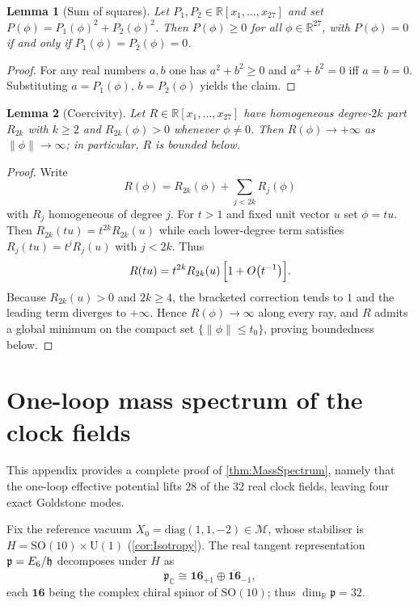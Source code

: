 \documentclass[pdflatex,sn-mathphys-num]{sn-jnl}
\theoremstyle{thmstyleone}
\newtheorem{lemma}[lemma]{Lemma}
\theoremstyle{thmstyletwo}%
\theoremstyle{thmstylethree}%
\newcommand{\SO}[1]{\mathrm{SO(#1)}}
\newcommand{\U}[1]{\mathrm{U(#1)}}
\newcommand{\E}[1]{\mathrm{E_{#1}}}
\newcommand{\SOTen}{\SO{10}}
\newcommand{\UOne}{\U{1}}
\newcommand{\ESix}{\E{6}}
\begin{document}
\begin{appendices}
\begin{lemma}[Sum of squares]\label{lem:A-sumsq}
Let $P_{1},P_{2}\in\mathbb R[x_{1},\dots,x_{27}]$ and set
\(P(\phi)=P_{1}(\phi)^{2}+P_{2}(\phi)^{2}\).
Then \(P(\phi)\ge 0\) for all \(\phi\in\mathbb R^{27}\), with
\(P(\phi)=0\) if and only if \(P_{1}(\phi)=P_{2}(\phi)=0\).
\end{lemma}

\begin{proof}
For any real numbers $a,b$ one has $a^{2}+b^{2}\ge 0$ and
$a^{2}+b^{2}=0$ iff $a=b=0$.  Substituting
\(a=P_{1}(\phi),\,b=P_{2}(\phi)\) yields the claim.
\end{proof}

\begin{lemma}[Coercivity]\label{lem:A-coercive}
Let \(R\in\mathbb R[x_{1},\dots,x_{27}]\) have homogeneous degree-$2k$
part \(R_{2k}\) with $k\ge2$ and \(R_{2k}(\phi)>0\) whenever
\(\phi\neq 0\).  Then \(R(\phi)\to +\infty\) as
\(\|\phi\|\to\infty\); in particular, \(R\) is bounded below.
\end{lemma}

\begin{proof}
Write
\[R(\phi)=R_{2k}(\phi)+\sum_{j<2k}R_{j}(\phi)\]
with $R_{j}$ homogeneous of degree $j$.  For
\(t>1\) and fixed unit vector \(u\) set $\phi=tu$.  Then
\(R_{2k}(tu)=t^{2k}R_{2k}(u)\) while each lower-degree term satisfies
\(R_{j}(tu)=t^{j}R_{j}(u)\) with $j<2k$.  Thus
\[
  R(tu)=t^{2k}R_{2k}(u)\,\Bigl[1+O\bigl(t^{-1}\bigr)\Bigr].
\]
Because \(R_{2k}(u)>0\) and \(2k\ge4\), the bracketed correction tends to
$1$ and the leading term diverges to \(+\infty\).  Hence
\(R(\phi)\to\infty\) along every ray, and $R$ admits a global minimum on
the compact set $\{\|\phi\|\le t_{0}\}$, proving boundedness below.
\end{proof}

\section{One-loop mass spectrum of the clock fields}
\label{app:Spectrum}
This appendix provides a complete proof of \autoref{thm:MassSpectrum},
namely that the one-loop effective potential lifts $28$ of the
$32$ real clock fields, leaving four exact Goldstone modes.

Fix the reference vacuum \(X_{0}=\mathrm{diag}(1,1,-2)\in\mathcal M\),
whose stabiliser is \(H=\SOTen\times \UOne\)
(\autoref{cor:Isotropy}).  The real tangent representation
\(\mathfrak{p}=\mathfrak \ESix/\mathfrak h\) decomposes under \(H\) as
\begin{equation}\label{eq:branch}
  \mathfrak p_{\mathbb C}
  \cong
  \mathbf{16}_{+1}\oplus\overline{\mathbf{16}}_{-1},
\end{equation}
each $\mathbf{16}$ being the complex chiral spinor of $\SOTen$;
thus \(\dim_{\mathbb R}\mathfrak p=32\).


\end{appendices}
\end{document}
